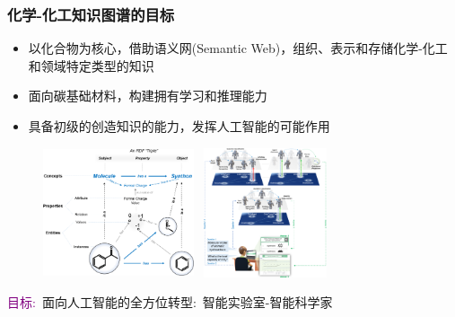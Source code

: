 \begin{frame}[allowframebreaks]
	\frametitle{化学-化工知识图谱的目标}
	\begin{itemize}
		\item 以化合物为核心，借助语义网\textrm{(Semantic Web)}，组织、表示和存储化学-化工和领域特定类型的知识
	\item 面向碳基础材料，构建拥有学习和推理能力
		\item 具备初级的创造知识的能力，发挥人工智能的可能作用%
\end{itemize}
\begin{figure}[h!]
\centering
\includegraphics[height=1.50in,width=1.75in,viewport=0 0 950 790,clip]{Figures/Mapping-the-relationship-between-molecule-and-synthon.png}
\hspace{5pt}
\includegraphics[height=1.50in,width=1.55in,viewport=0 0 750 790,clip]{Figures/TWA-KG-Marie.png}
\label{Fig:Mapping-relationship-molecule-synthon-2}
\end{figure}
\textcolor{purple}{目标:}~面向人工智能的全方位转型:~智能实验室-智能科学家
\end{frame}

